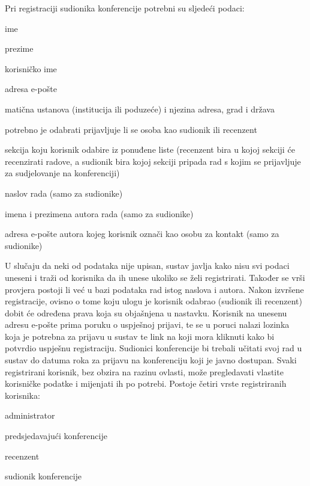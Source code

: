 		\newline
		\newline
		\indent Pri registraciji sudionika konferencije potrebni su sljedeći podaci:

		\begin{packed_item}

			\item ime
			\item prezime
			\item korisničko ime
			\item adresa e-pošte
			\item matična ustanova (institucija ili poduzeće) i njezina adresa, grad i država
			\item potrebno je odabrati prijavljuje li se osoba kao sudionik ili recenzent
			\item sekcija koju korisnik odabire iz ponuđene liste (recenzent bira u kojoj sekciji će recenzirati radove, a sudionik bira kojoj sekciji pripada rad s kojim se prijavljuje za sudjelovanje na konferenciji)
			\item naslov rada (samo za sudionike)
			\item imena i prezimena autora rada (samo za sudionike)
			\item adresa e-pošte autora kojeg korisnik označi kao osobu za kontakt (samo za sudionike)
		
		\end{packed_item}
	
		U slučaju da neki od podataka nije upisan, sustav javlja kako nisu svi podaci uneseni i traži od korisnika da ih unese ukoliko se želi registrirati. Također se vrši provjera postoji li već u bazi podataka rad istog naslova i autora. Nakon izvršene registracije, ovisno o tome koju ulogu je korisnik odabrao (sudionik ili recenzent) dobit će određena prava koja su objašnjena u nastavku. Korisnik na unesenu adresu e-pošte prima poruku o uspješnoj prijavi, te se u poruci nalazi lozinka koja je potrebna za prijavu u sustav te link na koji mora kliknuti kako bi potvrdio uspješnu registraciju. Sudionici konferencije bi trebali učitati svoj rad u sustav do datuma roka za prijavu na konferenciju koji je javno dostupan.
		\newline
		\newline
		\indent Svaki registrirani korisnik, bez obzira na razinu ovlasti, može pregledavati vlastite korisničke podatke i mijenjati ih po potrebi.
		\newline
		\newline
		\indent Postoje četiri vrste registriranih korisnika:
		\begin{packed_item}
			
			\item administrator
			\item predsjedavajući konferencije
			\item recenzent
			\item sudionik konferencije
			
		\end{packed_item}
	
